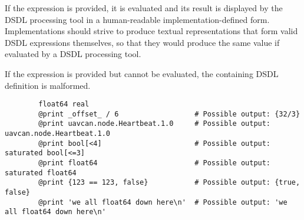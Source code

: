 If the expression is provided, it is evaluated and its result is displayed by the DSDL processing tool in
a human-readable implementation-defined form.
Implementations should strive to produce textual representations that form valid DSDL expressions themselves,
so that they would produce the same value if evaluated by a DSDL processing tool.

If the expression is provided but cannot be evaluated, the containing DSDL definition is malformed.

\begin{remark}
    \begin{verbatim}
        float64 real
        @print _offset_ / 6                  # Possible output: {32/3}
        @print uavcan.node.Heartbeat.1.0     # Possible output: uavcan.node.Heartbeat.1.0
        @print bool[<4]                      # Possible output: saturated bool[<=3]
        @print float64                       # Possible output: saturated float64
        @print {123 == 123, false}           # Possible output: {true, false}
        @print 'we all float64 down here\n'  # Possible output: 'we all float64 down here\n'
    \end{verbatim}
\end{remark}
